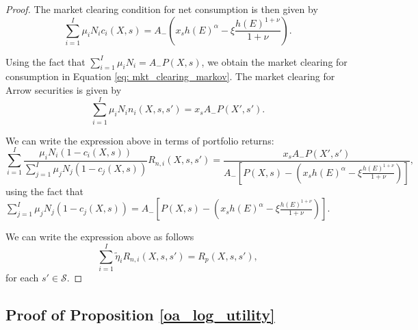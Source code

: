 \begin{proof}
The market clearing condition for net consumption is then given by
\begin{equation}
    \sum_{i=1}^I \mu_i N_i c_i(X,s) = A_{-} \left(x_s h(E)^\alpha - \xi \frac{h(E)^{1+\nu}}{1+\nu}\right).
\end{equation}

Using the fact that $\sum_{i=1}^I \mu_i N_i = A_{-} P(X,s)$, we obtain the market clearing for consumption in Equation \eqref{eq: mkt_clearing_markov}. 
The market clearing for Arrow securities is given by
\begin{equation}
    \sum_{i=1}^I \mu_i N_i n_i(X,s,s') = x_s A_{-} P(X',s').
\end{equation}

We can write the expression above in terms of portfolio returns:
\begin{equation}
    \sum_{i=1}^I \frac{\mu_i N_i(1-c_i(X,s))}{\sum_{j=1}^I \mu_j N_j(1-c_j(X,s))} R_{n,i}(X,s,s') = \frac{x_s A_{-} P(X',s')}{A_{-} \left[ P(X,s) - \left(x_s h(E)^\alpha - \xi \frac{h(E)^{1+\nu}}{1+\nu}\right) \right] },
\end{equation}
using the fact that $\sum_{j=1}^I \mu_j N_j(1-c_j(X,s)) =A_{-} \left[ P(X,s) - \left(x_s h(E)^\alpha - \xi \frac{h(E)^{1+\nu}}{1+\nu}\right) \right] $.

We can write the expression above as follows
\begin{equation}
    \sum_{i=1}^I \tilde{\eta}_i R_{n,i}(X,s,s') = R_p(X,s,s'),
\end{equation}
for each $s' \in \mathcal{S}$.
\end{proof}

\subsection{Proof of Proposition \ref{oa_log_utility}}\label{proof:oa_log_utility}

